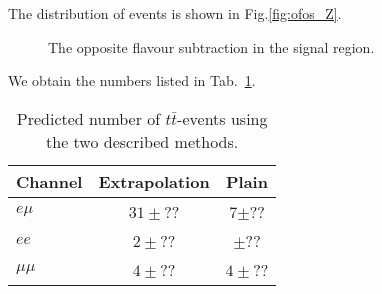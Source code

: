 The distribution of events is shown in Fig.\ref{fig:ofos_Z}. 

\begin{figure}[hbtp]
  \hfill
  \caption{The opposite flavour subtraction in the signal region.}
\end{figure}

We obtain the numbers listed in Tab.~\ref{tab:ofosZ}.

\begin{table}[hbtp]
\caption{Predicted number of $t\bar{t}$-events using the two described methods. \label{tab:ofosZ}}
\begin{center}
\begin{tabular}{|l||c|c|} \hline
Channel    &   Extrapolation & Plain\\\hline \hline
$e\mu$& $31\pm$?? & 7$\pm$?? \\\hline  
$ee$&  $2\pm$??  & $\pm$?? \\\hline  
$\mu\mu$ & $4\pm$?? & $4\pm$??\\\hline  
\end{tabular}
\end{center}
\end{table}





